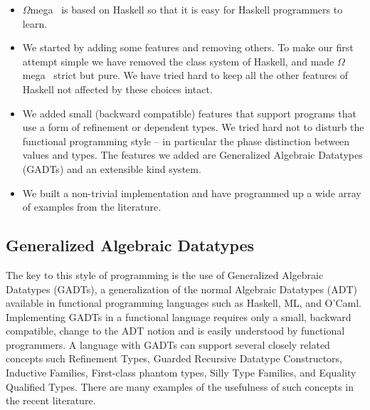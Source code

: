 \documentclass{sigplanconf}
\newcommand{\om}{$\Omega$mega}
\begin{document}
\begin{itemize}

\item \om~ is based on Haskell so
that it is easy for Haskell programmers to learn.

\item We started by adding some features and removing others. To make
our first attempt simple we have removed the class system of Haskell,
and made \om~ strict but pure. We have tried hard to keep all the other
features of Haskell not affected by these choices intact.

\item We added small (backward compatible) features that support 
programs that use a form of refinement or dependent types. We tried hard
not to disturb the functional programming style -- in particular the phase
distinction between values and types. The features we added are Generalized
Algebraic Datatypes (GADTs) and an extensible kind system.

\item We built a non-trivial implementation and have programmed up a
wide array of examples from the literature.

\end{itemize}

\subsection{Generalized Algebraic Datatypes}

The key to this style of programming is the use of Generalized
Algebraic Datatypes (GADTs), a generalization of the normal
Algebraic Datatypes (ADT) available in functional programming
languages such as Haskell, ML, and O'Caml. Implementing GADTs
in a functional language requires only a small, backward
compatible, change to the ADT notion and is easily understood
by functional programmers. A language with GADTs can
support several closely related concepts such Refinement
Types\cite{113468,Xi:1999:DTP,Davies97}, Guarded Recursive Datatype
Constructors\cite{XiCheChe03}, Inductive
Families\cite{Coquand:1994:IDT,Dybjer:1999:FAI}, First-class phantom
types\cite{Hinze:03:Phantom}, Silly
Type Families\cite{sillyTF}, and Equality Qualified
Types\cite{Sheard:2004:LF,SheardLogFrWks04}. 
There are many
examples of the usefulness of such concepts in the
recent literature\cite{Baars:2002:TDT,XiChen2003,HinzeHaskellWorkshop02,PasalicLingerGpce,pottier2,pottier1,Xi:1998:EAB}.
\end{document}
